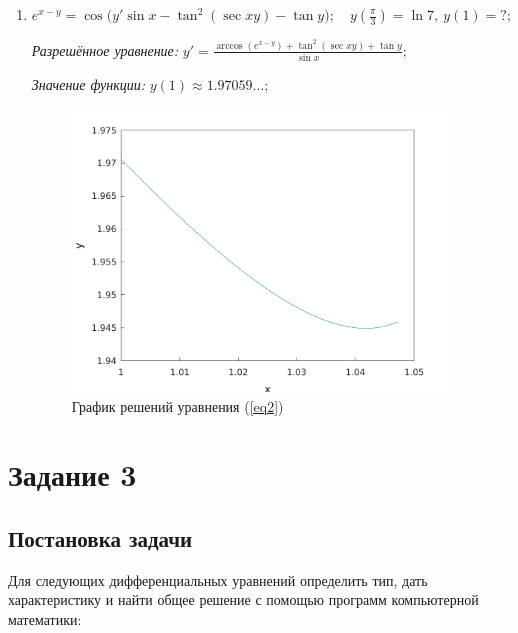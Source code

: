 \documentclass[14pt, a4paper, titlepage, fleqn]{extarticle}
\begin{document}
\begin{enumerate}
                \pagebreak
                

                \item \( e^{x-y} = \cos\big( y' \sin{x} - \tan^2(\sec{xy}) - \tan{y} \big); \quad y \left( \frac{\pi}{3} \right) = \ln 7, ~ y(1) = ?; \)
                    \label{eq2}

                    \textit{Разрешённое уравнение:}
                        \( y' = \frac{\arccos \left( e^{x-y} \right) + \tan^2 ( \sec{xy} ) + \tan y}{\sin x}; \)

                    \textit{Значение функции:}
                        \( y\left( 1 \right) \approx 1.97059\dots;\)

                    \begin{figure}[H]
                        \centering
                        \includegraphics[width=10cm]{pictures/graph2_2.pdf}
                        \caption{График решений уравнения (\ref{eq2})}
                    \end{figure}

                    \pagebreak
                    

            \end{enumerate}



    \pagebreak

    \section{Задание 3}
        \subsection{Постановка задачи}
            Для следующих дифференциальных уравнений определить тип, дать характеристику и найти общее решение с помощью программ компьютерной математики:
\end{document}
